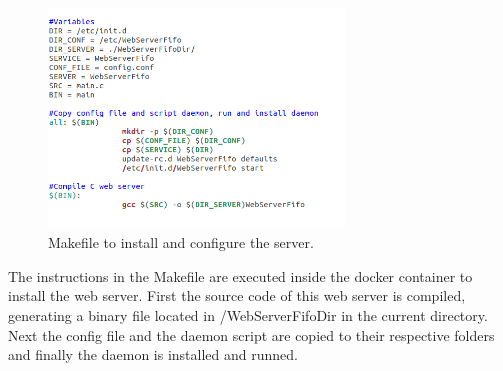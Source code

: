 \documentclass{article}
\begin{document}
\begin{figure}[H]
	\centering
	\captionsetup{justification=centering, margin=1cm}
    \includegraphics[width = 0.7\textwidth]{makefile.png}
    \caption{Makefile to install and configure the server.}
	\label{fig:makefile}
\end{figure}

The instructions in the Makefile are executed inside the docker container to install the web server. First the source code of this web server is compiled, generating a binary file located in /WebServerFifoDir in the current directory. Next the config file and the daemon script are copied to their respective folders and finally the daemon is installed and runned.\\
\end{document}
